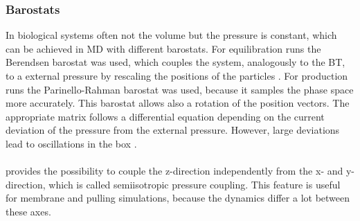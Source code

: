 \subsubsection{Barostats}
In biological systems often not the volume but the pressure is constant, which can be achieved in MD with different barostats. For equilibration runs the Berendsen barostat \autocite{berendsen} was used, which couples the system, analogously to the BT, to a external pressure by rescaling the positions of the particles \autocite[p. 36]{gromacsManual}. For production runs the Parinello-Rahman barostat \autocites{parinelloBarostat}{parinelloBarostat2} was used, because it samples the phase space more accurately. This barostat allows also a rotation of the position vectors. The appropriate matrix follows a differential equation depending on the current deviation of the pressure from the external pressure. However, large deviations lead to oscillations in the box \autocite[p. 36]{gromacsManual}.\\
\\
\gromacs{} provides the possibility to couple the z-direction independently from the x- and y-direction, which is called semiisotropic pressure coupling. This feature is useful for membrane and pulling simulations, because the dynamics differ a lot between these axes.